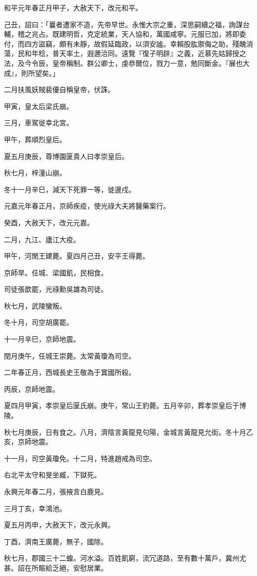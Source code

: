 \begin{pinyinscope}
和平元年春正月甲子，大赦天下，改元和平。

己丑，詔曰：「曩者遭家不造，先帝早世。永惟大宗之重，深思嗣續之福，詢謀台輔，稽之兆占。既建明哲，克定統業，天人協和，萬國咸寧。元服已加，將即委付，而四方盜竊，頗有未靜，故假延臨政，以須安謐。幸賴股肱禦侮之助，殘醜消蕩，民和年稔，普天率土，遐邇洽同。遠覽『復子明辟』之義，近慕先姑歸授之法，及今令辰，皇帝稱制。群公卿士，虔恭爾位，戮力一意，勉同斷金。『展也大成』，則所望矣。」

二月扶風妖賊裴優自稱皇帝，伏誅。

甲寅，皇太后梁氏崩。

三月，車駕徙幸北宮。

甲午，葬順烈皇后。

夏五月庚辰，尊博園匽貴人曰孝崇皇后。

秋七月，梓潼山崩。

冬十一月辛巳，減天下死罪一等，徙邊戍。

元嘉元年春正月，京師疾疫，使光祿大夫將醫藥案行。

癸酉，大赦天下，改元元嘉。

二月，九江、廬江大疫。

甲午，河閒王建薨。夏四月己丑，安平王得薨。

京師旱。任城、梁國飢，民相食。

司徒張歆罷，光祿勳吳雄為司徒。

秋七月，武陵蠻叛。

冬十月，司空胡廣罷。

十一月辛巳，京師地震。

閏月庚午，任城王崇薨。太常黃瓊為司空。

二年春正月，西城長史王敬為于窴國所殺。

丙辰，京師地震。

夏四月甲寅，孝崇皇后匽氏崩。庚午，常山王豹薨。五月辛卯，葬孝崇皇后于博陵。

秋七月庚辰，日有食之。八月，濟陰言黃龍見句陽，金城言黃龍見允街。冬十月乙亥，京師地震。

十一月，司空黃瓊免。十二月，特進趙戒為司空。

右北平太守和旻坐臧，下獄死。

永興元年春二月，張掖言白鹿見。

三月丁亥，幸鴻池。

夏五月丙申，大赦天下，改元永興。

丁酉，濟南王廣薨，無子，國除。

秋七月，郡國三十二蝗。河水溢。百姓飢窮，流冗道路，至有數十萬戶，冀州尤甚。詔在所賑給乏絕，安慰居業。


\end{pinyinscope}
